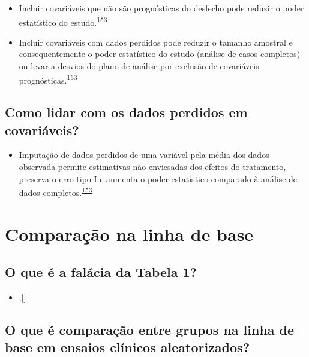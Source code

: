 \documentclass[
  a4paper,
]{book}
\providecommand{\tightlist}{%
  \setlength{\itemsep}{0pt}\setlength{\parskip}{0pt}}
\begin{document}
\begin{itemize}
\item
  Incluir covariáveis que não são prognósticas do desfecho pode reduzir o poder estatístico do estudo.\textsuperscript{\protect\hyperlink{ref-Kahan2014}{153}}
\item
  Incluir covariáveis com dados perdidos pode reduzir o tamanho amostral e consequentemente o poder estatístico do estudo (análise de casos completos) ou levar a desvios do plano de análise por exclusão de covariáveis prognósticas.\textsuperscript{\protect\hyperlink{ref-Kahan2014}{153}}
\end{itemize}

\hypertarget{como-lidar-com-os-dados-perdidos-em-covariuxe1veis}{%
\subsection{Como lidar com os dados perdidos em covariáveis?}\label{como-lidar-com-os-dados-perdidos-em-covariuxe1veis}}

\begin{itemize}
\tightlist
\item
  Imputação de dados perdidos de uma variável pela média dos dados observada permite estimativas não enviesadas dos efeitos do tratamento, preserva o erro tipo I e aumenta o poder estatístico comparado à análise de dados completos.\textsuperscript{\protect\hyperlink{ref-Kahan2014}{153}}
\end{itemize}

\hypertarget{comparacao-linha-de-base}{%
\section{Comparação na linha de base}\label{comparacao-linha-de-base}}

\hypertarget{o-que-uxe9-a-faluxe1cia-da-tabela-1}{%
\subsection{O que é a falácia da Tabela 1?}\label{o-que-uxe9-a-faluxe1cia-da-tabela-1}}

\begin{itemize}
\tightlist
\item
  .{[}{]}
\end{itemize}

\hypertarget{o-que-uxe9-comparauxe7uxe3o-entre-grupos-na-linha-de-base-em-ensaios-cluxednicos-aleatorizados}{%
\subsection{O que é comparação entre grupos na linha de base em ensaios clínicos aleatorizados?}\label{o-que-uxe9-comparauxe7uxe3o-entre-grupos-na-linha-de-base-em-ensaios-cluxednicos-aleatorizados}}
\end{document}
